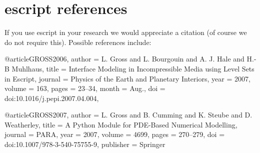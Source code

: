 
%
%
%

\pagebreak

\section{escript references}
\label{app:ourrefs}

If you use escript in your research we would appreciate a citation (of course we do not require this).
Possible references include:

\begin{shellCode}
@article{GROSS2006,
        author = {L. Gross and L. Bourgouin and A. J. Hale and H.-B Muhlhaus},
        title = {Interface Modeling in Incompressible Media 
	using Level Sets in Escript},
        journal = {Physics of the Earth and Planetary Interiors},
        year = 2007,
        volume = {163},
        pages = {23--34},
        month = {Aug.},
        doi = {doi:10.1016/j.pepi.2007.04.004},
}
\end{shellCode}

\begin{shellCode}
@article{GROSS2007,
	author = {L. Gross and B. Cumming and K. Steube and D. Weatherley},
	title = {A Python Module for PDE-Based Numerical Modelling},
	journal = {PARA},
	year = {2007},
	volume = {4699},
	pages = {270--279},
	doi = {doi:10.1007/978-3-540-75755-9},
	publisher = {Springer}
}
\end{shellCode}

